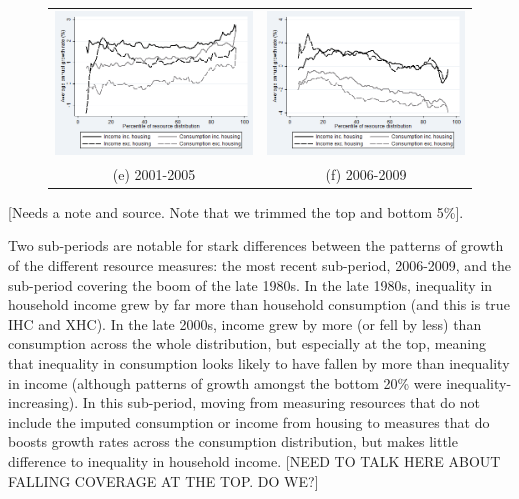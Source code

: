 \begin{figure}
\begin{tabular}{cc}
\includegraphics[width=.5\linewidth]{pictures/gic_5.png} & \includegraphics[width=.5\linewidth]{pictures/gic_6.png} \\
(e) 2001-2005 & (f) 2006-2009
\end{tabular}
\label{fig:gicsub}
\end{figure}

[Needs a note and source. Note that we trimmed the top and bottom 5\%].

Two sub-periods are notable for stark differences between the patterns of growth of the different resource measures: the most recent sub-period, 2006-2009, and the sub-period covering the boom of the late 1980s.  In the late 1980s, inequality in household income grew by far more than household consumption (and this is true IHC and XHC). In the late 2000s, income grew by more (or fell by less) than consumption across the whole distribution, but especially at the top, meaning that inequality in consumption looks likely to have fallen by more than inequality in income (although patterns of growth amongst the bottom 20\% were inequality-increasing). In this sub-period, moving from measuring resources that do not include the imputed consumption or income from housing to measures that do boosts growth rates across the consumption distribution, but makes little difference to inequality in household income. [NEED TO TALK HERE ABOUT FALLING COVERAGE AT THE TOP. DO WE?]



